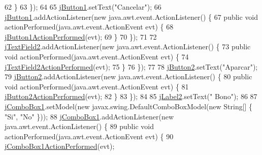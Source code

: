 \begin{DoxyCode}
62             \}
63         \});
64 
65         \mbox{\hyperlink{classejercicio2_1_1_camion_interfaz_a782e2170ce45db1bd1d32b61d1d7be8c}{jButton1}}.setText(\textcolor{stringliteral}{"Cancelar"});
66         \mbox{\hyperlink{classejercicio2_1_1_camion_interfaz_a782e2170ce45db1bd1d32b61d1d7be8c}{jButton1}}.addActionListener(\textcolor{keyword}{new} java.awt.event.ActionListener() \{
67             \textcolor{keyword}{public} \textcolor{keywordtype}{void} actionPerformed(java.awt.event.ActionEvent evt) \{
68                 \mbox{\hyperlink{classejercicio2_1_1_camion_interfaz_a46d5fa816420dfcdd1f92e946a42bf24}{jButton1ActionPerformed}}(evt);
69             \}
70         \});
71 
72         \mbox{\hyperlink{classejercicio2_1_1_camion_interfaz_a08c1f3dc1cf2e8d6f09958c97ecdcd6e}{jTextField2}}.addActionListener(\textcolor{keyword}{new} java.awt.event.ActionListener() \{
73             \textcolor{keyword}{public} \textcolor{keywordtype}{void} actionPerformed(java.awt.event.ActionEvent evt) \{
74                 \mbox{\hyperlink{classejercicio2_1_1_camion_interfaz_afc95c6247a265c4899531f4883bc5e75}{jTextField2ActionPerformed}}(evt);
75             \}
76         \});
77 
78         \mbox{\hyperlink{classejercicio2_1_1_camion_interfaz_aa5f586a69f5266a210a12f6873d21657}{jButton2}}.setText(\textcolor{stringliteral}{"Aparcar"});
79         \mbox{\hyperlink{classejercicio2_1_1_camion_interfaz_aa5f586a69f5266a210a12f6873d21657}{jButton2}}.addActionListener(\textcolor{keyword}{new} java.awt.event.ActionListener() \{
80             \textcolor{keyword}{public} \textcolor{keywordtype}{void} actionPerformed(java.awt.event.ActionEvent evt) \{
81                 \mbox{\hyperlink{classejercicio2_1_1_camion_interfaz_ac15dc3135ad2cdd45b4760373de80418}{jButton2ActionPerformed}}(evt);
82             \}
83         \});
84 
85         \mbox{\hyperlink{classejercicio2_1_1_camion_interfaz_a4a0e429b6f6d6aeb7911a2e89cfcf384}{jLabel2}}.setText(\textcolor{stringliteral}{"         Bono"});
86 
87         \mbox{\hyperlink{classejercicio2_1_1_camion_interfaz_ad99726150fad438267d353b48c6aaf7d}{jComboBox1}}.setModel(\textcolor{keyword}{new} javax.swing.DefaultComboBoxModel(\textcolor{keyword}{new} String[] \{ \textcolor{stringliteral}{"Si"}, \textcolor{stringliteral}{"No"} \}));
88         \mbox{\hyperlink{classejercicio2_1_1_camion_interfaz_ad99726150fad438267d353b48c6aaf7d}{jComboBox1}}.addActionListener(\textcolor{keyword}{new} java.awt.event.ActionListener() \{
89             \textcolor{keyword}{public} \textcolor{keywordtype}{void} actionPerformed(java.awt.event.ActionEvent evt) \{
90                 \mbox{\hyperlink{classejercicio2_1_1_camion_interfaz_a636cf97354884d87701e174ee0d7f483}{jComboBox1ActionPerformed}}(evt);

\end{DoxyCode}
